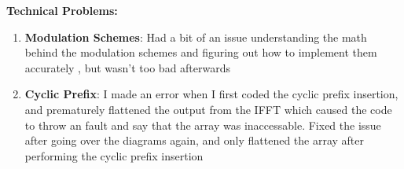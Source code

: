 \documentclass[letterpaper, 11pt]{article}
\newcommand{\secHeader}[1]{\vspace{2mm} \noindent \textbf{#1:}\vspace{-4mm}}
\begin{document}
\newpage
\secHeader{Technical Problems}
\vspace{5mm}
\begin{enumerate}
    \item \textbf{Modulation Schemes}: Had a bit of an issue understanding the math behind the modulation schemes and figuring out how to implement them accurately
    , but wasn't too bad afterwards
    \item \textbf{Cyclic Prefix}: I made an error when I first coded the cyclic prefix insertion, and prematurely flattened the output from the IFFT which caused the code to throw an
    fault and say that the array was inaccessable. Fixed the issue after going over the diagrams again, and only flattened the array after performing the cyclic prefix insertion
\end{enumerate} 
\end{document}
